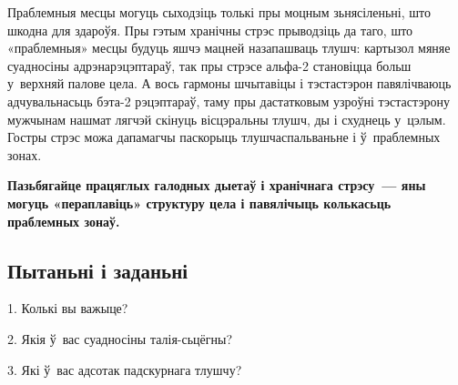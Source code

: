 Праблемныя месцы могуць сыходзіць толькі пры моцным зьнясіленьні, што шкодна для здароўя. Пры гэтым хранічны стрэс прыводзіць да таго, што «праблемныя» месцы будуць яшчэ мацней назапашваць тлушч: картызол мяняе суадносіны адрэнарэцэптараў, так пры стрэсе альфа-2 становіцца больш у~верхняй палове цела. А вось гармоны шчытавіцы і тэстастэрон павялічваюць адчувальнасьць бэта-2 рэцэптараў, таму пры дастатковым узроўні тэстастэрону мужчынам нашмат лягчэй скінуць вісцэральны тлушч, ды і схуднець у~цэлым. Гостры стрэс можа дапамагчы паскорыць тлушчаспальваньне і ў~праблемных зонах. 

\textbf{Пазьбягайце працяглых галодных дыетаў і хранічнага стрэсу~--- яны могуць «пераплавіць» структуру цела і павялічыць колькасьць праблемных зонаў.}

\subsection*{Пытаньні і заданьні}

1. Колькі вы важыце?

2. Якія ў~вас суадносіны талія-сьцёгны?

3. Які ў~вас адсотак падскурнага тлушчу?

